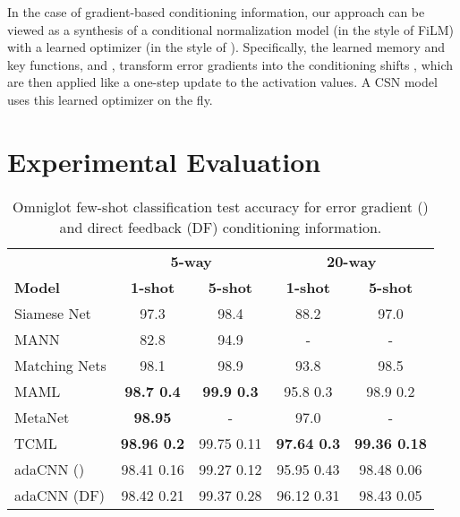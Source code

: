 \documentclass{article}
\begin{document}
In the case of gradient-based conditioning information, our approach can be viewed as a synthesis of a conditional normalization model (in the style of FiLM) with a learned optimizer (in the style of \citet{andrychowicz2016learning}).
Specifically, the learned memory and key functions,  and , transform error gradients into the conditioning shifts , which are then applied like a one-step update to the activation values.
A CSN model uses this learned optimizer on the fly.

\section{Experimental Evaluation}
\label{sec_results}
\begin{table*}[t] \caption{Omniglot few-shot classification test accuracy for error gradient () and direct feedback (DF) conditioning information.}
  \label{tab:omni}
  \small
  \centering
  \begin{tabular}{lcccc}
    \toprule
    {} & \multicolumn{2}{c}{\bf 5-way} & \multicolumn{2}{c}{\bf 20-way}   \\
    \cmidrule(l{3pt}r{3pt}){2-3} \cmidrule(l{3pt}r{3pt}){4-5}
    \bf Model & \bf 1-shot & \bf 5-shot & \bf 1-shot & \bf 5-shot             \\
    \midrule
    Siamese Net \cite{koch2015siamese} & 97.3 & 98.4 & 88.2 & 97.0 \\
    MANN \cite{santoro2016meta} & 82.8 & 94.9 & - & - \\
    Matching Nets \cite{vinyals2016matching} & 98.1 & 98.9 & 93.8 & 98.5 \\
    MAML \cite{finn2017model} & \bf 98.7  0.4 & \bf 99.9  0.3 & 95.8  0.3 & 98.9  0.2 \\
    MetaNet \cite{pmlr-v70-munkhdalai17a} & \bf 98.95 & - & 97.0 & - \\
    TCML \cite{mishra2017meta} & \bf 98.96  0.2 & 99.75  0.11 & \bf 97.64  0.3 & \bf 99.36  0.18 \\
    \midrule
adaCNN () & 98.41  0.16 & 99.27  0.12 & 95.95  0.43 & 98.48  0.06 \\
adaCNN (DF) & 98.42  0.21 & 99.37  0.28 & 96.12  0.31 & 98.43  0.05 \\
    \bottomrule
  \end{tabular}
\end{table*}
\end{document}
